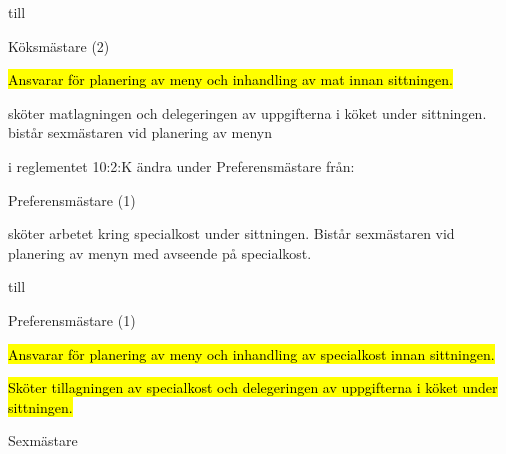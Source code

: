 \documentclass[../_main/handlingar.tex]{subfiles}
\begin{document}
\begin{attsatser}
    till 
    
    \begin{emptylist}
    \item Köksmästare (2)
      \begin{dashlist}
        \item \hl{Ansvarar för planering av meny och inhandling av mat innan sittningen.}
        \item sköter matlagningen och delegeringen av uppgifterna i köket under sittningen. bistår sexmästaren vid planering av menyn
      \end{dashlist}
    \end{emptylist}
  \changenote


    \att i reglementet 10:2:K ändra under Preferensmästare från:\par

    \begin{emptylist}
    \item Preferensmästare (1) 
      \begin{dashlist}
        \item sköter arbetet kring specialkost under sittningen. Bistår sexmästaren vid planering av menyn med avseende på specialkost.
      \end{dashlist}
    \end{emptylist}
    
    till 
    
    \begin{emptylist}
    \item Preferensmästare (1)
      \begin{dashlist}
        \item \hl{Ansvarar för planering av meny och inhandling av specialkost innan sittningen.}
        \item \hl{Sköter tillagningen av specialkost och delegeringen av uppgifterna i köket under sittningen.}
      \end{dashlist}
    \end{emptylist}
  \changenote



\end{attsatser}



\begin{signatures}{1}
    \ist
    \signature{\sexm}{Sexmästare}
\end{signatures}
\end{document}
